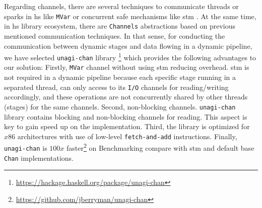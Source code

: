 Regarding channels, there are several techniques to communicate threads or sparks in \acrshort{hs} like \texttt{MVar} or concurrent safe mechanisms like \acrfull{stm} \cite{stm}. 
At the same time, in \acrshort{hs} library ecosystem, there are  \texttt{Channels} abstractions based on previous  mentioned communication techniques. 
In that sense, for conducting the co\-mmu\-ni\-ca\-tion between dynamic stages and data flowing in a dynamic pipeline, we have selected \texttt{unagi-chan} library \footnote{\url{https://hackage.haskell.org/package/unagi-chan}} which provides the following advantages to our solution: Firstly, \texttt{MVar} channel without using \acrshort{stm} reducing overhead. 
\acrshort{stm} is not required in a dynamic pipeline  because each specific stage running in a separated thread, can only access to its \texttt{I/O} channels for reading/writing accordingly, and these operations are not concurrently shared by other threads (stages) for the same channels. 
Second, non-blocking channels. \texttt{unagi-chan} library contains blocking and non-blocking channels for reading. This aspect is key to gain speed up on the implementation. Third, the library is optimized for $x86$ architectures with use of low-level \texttt{fetch-and-add} instructions. Finally, \texttt{unagi-chan} is $100x$ faster\footnote{\url{https://github.com/jberryman/unagi-chan}} on Benchmarking compare with \acrshort{stm} and default base \texttt{Chan} implementations.

